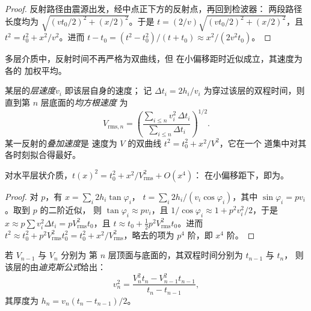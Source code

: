 \begin{proof}
反射路径由震源出发，经中点正下方的反射点，再回到检波器：
两段路径长度均为
$\sqrt{(vt_0/2)^2 + (x/2)^2}$。于是 $t = (2/v)\sqrt{(vt_0/2)^2 + (x/2)^2}$，且
$t^2 = t_0^2 + x^2/v^2$。进而 $t - t_0 = (t^2 - t_0^2)/(t + t_0) \approx
x^2/(2v^2t_0)$。
\end{proof}

多层介质中，反射时间不再严格为双曲线，但
在小偏移距时近似成立，其速度为各的
加权平均。

\begin{definition}\label{def:b3:exploration-seismology:velocities}
某层的\emph{层速度}$v_i$ 即该层自身的速度；
记 $\Delta t_i = 2h_i/v_i$ 为穿过该层的双程时间，则
直到第 $n$ 层底面的\emph{均方根速度}
为
\[
  V_{\text{rms},n} = \left(\frac{\sum_{i\le n}v_i^2\,\Delta t_i}{\sum_{i\le n}\Delta t_i}\right)^{1/2}.
\]
某一反射的\emph{叠加速度}是
速度为 $V$ 的双曲线 $t^2 = t_0^2 + x^2/V^2$，它在一个
道集中对其各时刻拟合得最好。
\end{definition}

\begin{proposition}[小偏移距时的叠加速度]\label{prop:b3:exploration-seismology:rms}
对水平层状介质，$t(x)^2 = t_0^2 + x^2/V_{\text{rms}}^2 + O(x^4)$：
在小偏移距下，即为。
\end{proposition}

\begin{proof}
对 $p$，有 $x = \sum_i 2h_i\tan\varphi_i$，
$t = \sum_i 2h_i/(v_i\cos\varphi_i)$，其中 $\sin\varphi_i = pv_i$。取到 $p$ 的二阶近似，
则 $\tan\varphi_i \approx pv_i$，且 $1/\cos\varphi_i \approx 1 +
p^2v_i^2/2$，于是 $x \approx p\sum v_i^2\Delta t_i = pV_{\text{rms}}^2t_0$，且
$t \approx t_0 + \tfrac12p^2V_{\text{rms}}^2t_0$。进而
$t^2 \approx t_0^2 + p^2V_{\text{rms}}^2t_0^2 = t_0^2 + x^2/V_{\text{rms}}^2$，略去的项为
$p^4$ 阶，即 $x^4$ 阶。
\end{proof}

\begin{theorem}[迪克斯公式]\label{thm:b3:exploration-seismology:dix}
若 $V_{n-1}$ 与 $V_n$ 分别为
第 $n$ 层顶面与底面的，其双程时间分别为 $t_{n-1}$ 与 $t_n$，
则该层的由\emph{迪克斯公式}给出：
\[
  v_n^2 = \frac{V_n^2t_n - V_{n-1}^2t_{n-1}}{t_n - t_{n-1}} ,
\]
其厚度为 $h_n = v_n(t_n - t_{n-1})/2$。
\end{theorem}

